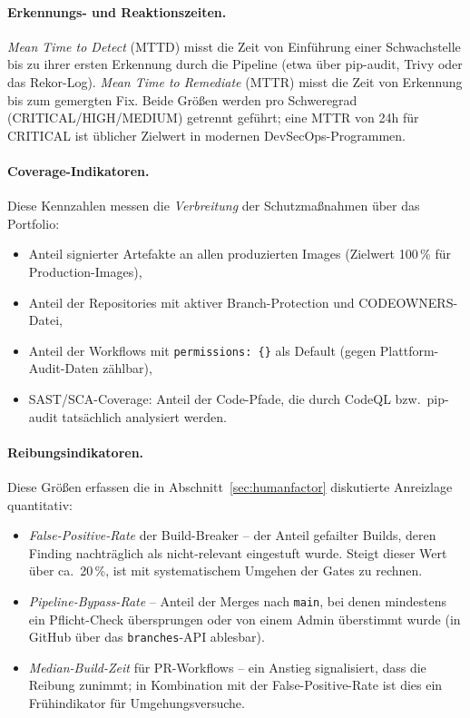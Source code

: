 \documentclass[12pt, a4paper]{scrartcl}
\begin{document}
\paragraph{Erkennungs- und Reaktionszeiten.}
\emph{Mean Time to Detect} (MTTD) misst die Zeit von Einführung
einer Schwachstelle bis zu ihrer ersten Erkennung durch die Pipeline
(etwa über pip-audit, Trivy oder das Rekor-Log). \emph{Mean Time to
Remediate} (MTTR) misst die Zeit von Erkennung bis zum gemergten Fix.
Beide Größen werden pro Schweregrad (CRITICAL/HIGH/MEDIUM) getrennt
geführt; eine MTTR von 24h für CRITICAL ist üblicher Zielwert in
modernen DevSecOps-Programmen.

\paragraph{Coverage-Indikatoren.}
Diese Kennzahlen messen die \emph{Verbreitung} der Schutzmaßnahmen
über das Portfolio:
\begin{itemize}[leftmargin=1.4em]
  \item Anteil signierter Artefakte an allen produzierten Images
        (Zielwert 100\,\% für Production-Images),
  \item Anteil der Repositories mit aktiver Branch-Protection und
        CODEOWNERS-Datei,
  \item Anteil der Workflows mit \texttt{permissions: \{\}} als Default
        (gegen Plattform-Audit-Daten zählbar),
  \item SAST/SCA-Coverage: Anteil der Code-Pfade, die durch CodeQL
        bzw.\ pip-audit tatsächlich analysiert werden.
\end{itemize}

\paragraph{Reibungsindikatoren.}
Diese Größen erfassen die in
Abschnitt~\ref{sec:humanfactor} diskutierte Anreizlage quantitativ:
\begin{itemize}[leftmargin=1.4em]
  \item \emph{False-Positive-Rate} der Build-Breaker -- der Anteil
        gefailter Builds, deren Finding nachträglich als
        nicht-relevant eingestuft wurde. Steigt dieser Wert über
        ca.~20\,\%, ist mit systematischem Umgehen der Gates zu rechnen.
  \item \emph{Pipeline-Bypass-Rate} -- Anteil der Merges nach
        \texttt{main}, bei denen mindestens ein Pflicht-Check
        übersprungen oder von einem Admin überstimmt wurde
        (in GitHub über das \texttt{branches}-API ablesbar).
  \item \emph{Median-Build-Zeit} für PR-Workflows -- ein Anstieg
        signalisiert, dass die Reibung zunimmt; in Kombination mit der
        False-Positive-Rate ist dies ein Frühindikator für
        Umgehungsversuche.
\end{itemize}
\end{document}

